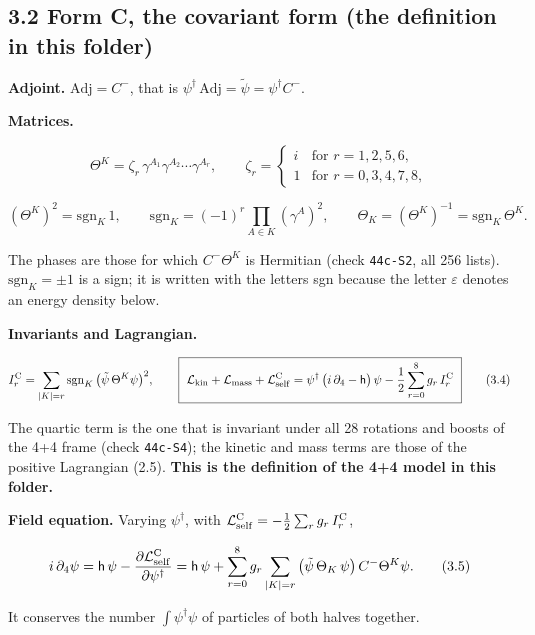 \documentclass[
  10pt,
]{article}
\begin{document}
\hypertarget{form-c-the-covariant-form-the-definition-in-this-folder}{%
\subsection{3.2 Form C, the covariant form (the definition in this
folder)}\label{form-c-the-covariant-form-the-definition-in-this-folder}}

\textbf{Adjoint.} \(\mathrm{Adj}=C^-\), that is
\(\psi^\dagger\,\mathrm{Adj}=\tilde\psi=\psi^\dagger C^-\).

\textbf{Matrices.}

\[\Theta^K=\zeta_r\,\gamma^{A_1}\gamma^{A_2}\cdots\gamma^{A_r},\qquad
\zeta_r=\begin{cases}i&\text{for }r=1,2,5,6,\\1&\text{for }r=0,3,4,7,8,\end{cases}\tag{3.2}\]

\[(\Theta^K)^2=\mathrm{sgn}_K\,1,\qquad\mathrm{sgn}_K=(-1)^r\prod_{A\in K}(\gamma^A)^2,\qquad
\Theta_K=(\Theta^K)^{-1}=\mathrm{sgn}_K\,\Theta^K.\tag{3.3}\]

The phases are those for which \(C^-\Theta^K\) is Hermitian (check
\texttt{44c-S2}, all 256 lists). \(\mathrm{sgn}_K=\pm1\) is a sign; it
is written with the letters sgn because the letter \(\varepsilon\)
denotes an energy density below.

\textbf{Invariants and Lagrangian.}

\[I_r^{\rm C}=\sum_{|K|=r}\mathrm{sgn}_K\,\big(\tilde\psi\,\Theta^K\psi\big)^2,\qquad
\boxed{\ \mathcal L_{\rm kin}+\mathcal L_{\rm mass}+\mathcal L_{\rm self}^{\rm C}=\psi^\dagger\,\big(i\,\partial_4-\mathsf h\big)\,\psi-\frac12\sum_{r=0}^{8}g_r\,I_r^{\rm C}\ }\tag{3.4}\]

The quartic term is the one that is invariant under all 28 rotations and
boosts of the 4+4 frame (check \texttt{44c-S4}); the kinetic and mass
terms are those of the positive Lagrangian (2.5). \textbf{This is the
definition of the 4+4 model in this folder.}

\textbf{Field equation.} Varying \(\psi^\dagger\), with
\(\mathcal L_{\rm self}^{\rm C}=-\tfrac12\sum_rg_r\,I_r^{\rm C}\),

\[i\,\partial_4\psi=\mathsf h\,\psi-\frac{\partial\mathcal L_{\rm self}^{\rm C}}{\partial\psi^\dagger}
=\mathsf h\,\psi+\sum_{r=0}^{8}g_r\sum_{|K|=r}\big(\tilde\psi\,\Theta_K\,\psi\big)\,C^-\Theta^K\psi.\tag{3.5}\]

It conserves the number \(\int\psi^\dagger\psi\) of particles of both
halves together.
\end{document}
